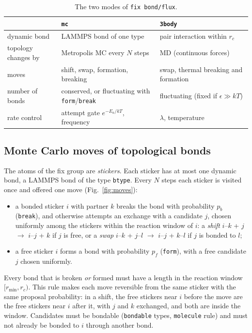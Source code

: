 \documentclass[a4paper]{tufte-handout}
\newcommand{\cmd}[1]{\texttt{#1}}
\begin{document}
\begin{table}[tp]
\footnotesize
\begin{tabular}{@{}P{21mm}P{37mm}P{37mm}@{}}
\toprule
 & \cmd{mc} & \cmd{3body} \\
\midrule
dynamic bond & LAMMPS bond of one type & pair interaction within $r_c$ \\
topology changes by & Metropolis MC every $N$ steps & MD (continuous forces) \\
moves & shift, swap, formation, breaking & swap, thermal breaking and formation \\
number of bonds & conserved, or fluctuating with \cmd{form}/\cmd{break} & fluctuating (fixed if $\epsilon\gg kT$) \\
rate control & attempt gate $e^{-E_a/kT}$, frequency & $\lambda$, temperature \\
\bottomrule
\end{tabular}
\caption{The two modes of \cmd{fix bond/flux}.}\label{tab:modes}
\end{table}

\subsection{Monte Carlo moves of topological bonds}

The atoms of the fix group are \emph{stickers}. Each sticker has at most one dynamic bond, a LAMMPS
bond of the type \cmd{btype}. Every $N$ steps each sticker is visited once and offered one move
(Fig.~\ref{fig:moves}):
\begin{itemize}
\item a bonded sticker $i$ with partner $k$ breaks the bond with probability $p_b$ (\cmd{break}),
  and otherwise attempts an exchange with a candidate $j$, chosen uniformly among the stickers
  within the reaction window of $i$:
  a \emph{shift} $i$--$k$ + $j$ $\to$ $i$--$j$ + $k$ if $j$ is free,
  or a \emph{swap} $i$--$k$ + $j$--$l$ $\to$ $i$--$j$ + $k$--$l$ if $j$ is bonded to $l$;
\item a free sticker $i$ forms a bond with probability $p_f$ (\cmd{form}), with a free candidate
  $j$ chosen uniformly.
\end{itemize}
Every bond that is broken \emph{or} formed must have a length in the reaction window
$[r_\text{min}, r_c)$. This rule makes each move reversible from the same sticker with the same
proposal probability: in a shift, the free stickers near $i$ before the move are the free stickers
near $i$ after it, with $j$ and $k$ exchanged, and both are inside the window. Candidates must be
bondable (\cmd{bondable} types, \cmd{molecule} rule) and must not already be bonded to $i$ through
another bond.
\end{document}
